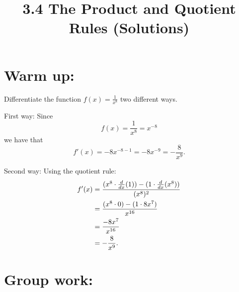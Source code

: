 \documentclass[nooutcomes]{ximera}
\title{3.4 The Product and Quotient Rules (Solutions)}
\begin{document}
\begin{abstract}		\end{abstract}
\maketitle

\section*{Warm up:} 
Differentiate the function $f(x) = \frac{1}{x^8}$ two different ways.

	\begin{freeResponse}
	First way:  Since 
	$$f(x) = \frac{1}{x^8} = x^{-8}$$
	we have that
	$$f'(x) = -8x^{-8-1} = -8x^{-9} = -\frac{8}{x^9}.$$
	
	Second way:  Using the quotient rule: 
	\begin{align*}
	f'(x) &= \frac{(x^8 \cdot \frac{d}{dx}(1)) - (1 \cdot \frac{d}{dx}(x^8))}{(x^8)^2}  \\
	&= \frac{(x^8 \cdot 0) - (1 \cdot 8x^7)}{x^{16}}  \\
	&= \frac{-8x^7}{x^{16}}  \\
	&= - \frac{8}{x^9}.
	\end{align*}
	\end{freeResponse}
	
	
	
	
	

\section*{Group work:}
\end{document}
